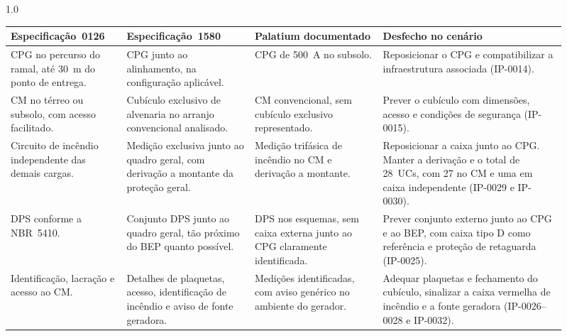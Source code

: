 \par\noindent
\begin{minipage}{\linewidth}
  \label{qua:sintese-palatium}
  \vspace{0.55\baselineskip}
  \centering
  \begin{Spacing}{1.0}
  {\small
  \renewcommand{\arraystretch}{1.12}
  \setlength{\tabcolsep}{4pt}
  \begin{tabular}{|>{\raggedright\arraybackslash}p{0.19\linewidth}|>{\raggedright\arraybackslash}p{0.21\linewidth}|>{\raggedright\arraybackslash}p{0.21\linewidth}|>{\raggedright\arraybackslash}p{0.30\linewidth}|}
    \hline
    \textbf{Especificação~0126} & \textbf{Especificação~1580} & \textbf{Palatium documentado} & \textbf{Desfecho no cenário} \\\hline
    CPG no percurso do ramal, até 30~m do ponto de entrega. & CPG junto ao alinhamento, na configuração aplicável. & CPG de 500~A no subsolo. & Reposicionar o CPG e compatibilizar a infraestrutura associada (IP-0014). \\\hline
    CM no térreo ou subsolo, com acesso facilitado. & Cubículo exclusivo de alvenaria no arranjo convencional analisado. & CM convencional, sem cubículo exclusivo representado. & Prever o cubículo com dimensões, acesso e condições de segurança (IP-0015). \\\hline
    Circuito de incêndio independente das demais cargas. & Medição exclusiva junto ao quadro geral, com derivação a montante da proteção geral. & Medição trifásica de incêndio no CM e derivação a montante. & Reposicionar a caixa junto ao CPG. Manter a derivação e o total de 28~UCs, com 27 no CM e uma em caixa independente (IP-0029 e IP-0030). \\\hline
    DPS conforme a NBR~5410. & Conjunto DPS junto ao quadro geral, tão próximo do BEP quanto possível. & DPS nos esquemas, sem caixa externa junto ao CPG claramente identificada. & Prever conjunto externo junto ao CPG e ao BEP, com caixa tipo D como referência e proteção de retaguarda (IP-0025). \\\hline
    Identificação, lacração e acesso ao CM. & Detalhes de plaquetas, acesso, identificação de incêndio e aviso de fonte geradora. & Medições identificadas, com aviso genérico no ambiente do gerador. & Adequar plaquetas e fechamento do cubículo, sinalizar a caixa vermelha de incêndio e a fonte geradora (IP-0026--0028 e IP-0032). \\\hline
  \end{tabular}}
  \end{Spacing}
\end{minipage}
\par

